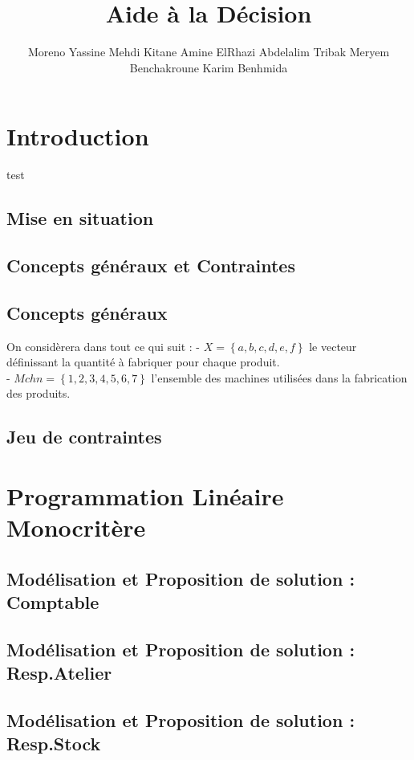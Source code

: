 \documentclass[a4paper, 11pt]{article}
\title{Aide à la Décision}
\author{Moreno Yassine \cr Mehdi Kitane \cr Amine ElRhazi \cr Abdelalim Tribak \cr Meryem Benchakroune \cr Karim Benhmida}
\begin{document}
\begin{LARGE}
\maketitle
\end{LARGE}

\tableofcontents
\newpage

\section{Introduction}
test
\subsection{Mise en situation}
\subsection{Concepts généraux et Contraintes}
\subsection*{Concepts généraux}
On considèrera dans tout ce qui suit : 
- $X = \left\{a, b, c, d, e, f\right\}$ le vecteur définissant la quantité à fabriquer pour chaque produit.  \\
- $Mchn = \left\{1, 2, 3, 4, 5, 6, 7\right\}$ l'ensemble des machines utilisées dans la fabrication des produits.  \\

\subsection*{Jeu de contraintes}

\section{Programmation Linéaire Monocritère}
\subsection{Modélisation et Proposition de solution : Comptable}
\subsection{Modélisation et Proposition de solution : Resp.Atelier}
\subsection{Modélisation et Proposition de solution : Resp.Stock}
\end{document}
